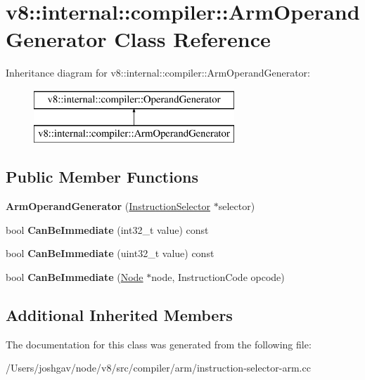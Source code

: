 \hypertarget{classv8_1_1internal_1_1compiler_1_1_arm_operand_generator}{}\section{v8\+:\+:internal\+:\+:compiler\+:\+:Arm\+Operand\+Generator Class Reference}
\label{classv8_1_1internal_1_1compiler_1_1_arm_operand_generator}
Inheritance diagram for v8\+:\+:internal\+:\+:compiler\+:\+:Arm\+Operand\+Generator\+:\begin{figure}[H]
\begin{center}
\leavevmode
\includegraphics[height=2.000000cm]{classv8_1_1internal_1_1compiler_1_1_arm_operand_generator}
\end{center}
\end{figure}
\subsection*{Public Member Functions}
\begin{DoxyCompactItemize}
\item 
{\bfseries Arm\+Operand\+Generator} (\hyperlink{classv8_1_1internal_1_1compiler_1_1_instruction_selector}{Instruction\+Selector} $\ast$selector)\hypertarget{classv8_1_1internal_1_1compiler_1_1_arm_operand_generator_a5844390d4f360a0dde8fb866f7a65b6e}{}\label{classv8_1_1internal_1_1compiler_1_1_arm_operand_generator_a5844390d4f360a0dde8fb866f7a65b6e}

\item 
bool {\bfseries Can\+Be\+Immediate} (int32\+\_\+t value) const \hypertarget{classv8_1_1internal_1_1compiler_1_1_arm_operand_generator_a25bb4de4072c061985c6e31e17822d8f}{}\label{classv8_1_1internal_1_1compiler_1_1_arm_operand_generator_a25bb4de4072c061985c6e31e17822d8f}

\item 
bool {\bfseries Can\+Be\+Immediate} (uint32\+\_\+t value) const \hypertarget{classv8_1_1internal_1_1compiler_1_1_arm_operand_generator_ac12857ca17eeb3ee229818c8750e6f67}{}\label{classv8_1_1internal_1_1compiler_1_1_arm_operand_generator_ac12857ca17eeb3ee229818c8750e6f67}

\item 
bool {\bfseries Can\+Be\+Immediate} (\hyperlink{classv8_1_1internal_1_1compiler_1_1_node}{Node} $\ast$node, Instruction\+Code opcode)\hypertarget{classv8_1_1internal_1_1compiler_1_1_arm_operand_generator_a92b56593f00f3ff06025e2438dc9747f}{}\label{classv8_1_1internal_1_1compiler_1_1_arm_operand_generator_a92b56593f00f3ff06025e2438dc9747f}

\end{DoxyCompactItemize}
\subsection*{Additional Inherited Members}


The documentation for this class was generated from the following file\+:\begin{DoxyCompactItemize}
\item 
/\+Users/joshgav/node/v8/src/compiler/arm/instruction-\/selector-\/arm.\+cc\end{DoxyCompactItemize}

